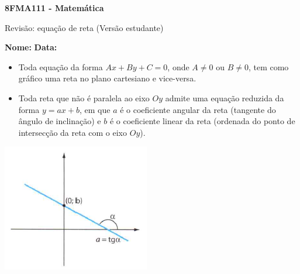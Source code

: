 \documentclass[a4paper,14pt]{article}
\begin{document}
	
	\noindent\textbf{8FMA111 - Matemática} 
	
	\begin{center}Revisão: equação de reta (Versão estudante)
	\end{center}
	
	\noindent\textbf{Nome:} \underline{\hspace{10cm}}
	\noindent\textbf{Data:} \underline{\hspace{4cm}}
	
	
	\begin{multicols}{2}
		\noindent \begin{itemize} \item Toda equação da forma $Ax + By + C = 0$, onde $A \neq 0$ ou $B \neq 0$, tem como gráfico uma reta no plano cartesiano e vice-versa. 
		\item Toda reta que não é paralela ao eixo $Oy$ admite uma equação reduzida da forma $y = ax + b$, em que $a$ é o coeficiente angular da reta (tangente do ângulo de inclinação) e $b$ é o coeficiente linear da reta (ordenada do ponto de intersecção da reta com o eixo $Oy$).
		\end{itemize}
		\includegraphics[width=1\linewidth]{8FMA111_imagens/imagem1}
		
	\end{multicols}
\end{document}

